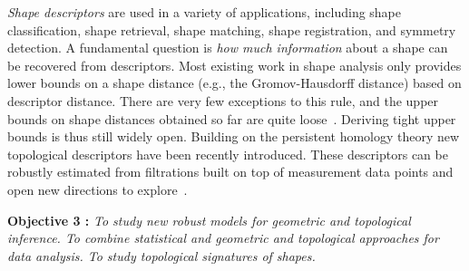 {\em Shape descriptors} are used in a variety of applications, including shape classification, shape retrieval, shape matching, shape registration, and symmetry detection.  %
A fundamental question is {\em how much information} about a shape can be recovered from descriptors. Most existing work in shape analysis only provides lower bounds on a shape distance (e.g., the Gromov-Hausdorff distance) based on descriptor distance. There are very few exceptions to this rule, and the upper bounds on shape distances obtained so far are quite loose~\cite{bbk-gmds-06,ms-gh-05}. Deriving tight upper bounds is thus still widely open. 
Building on the persistent homology theory new topological descriptors have been recently introduced. These descriptors can be robustly estimated from filtrations built on top of measurement data points  and open new directions to explore~\cite{ccgmo-ghsssp-09, socg-pbsds-10}.



\vspace{2mm}

{\bf Objective 3 :} {\em To study new {\em robust models for geometric and topological inference}.  To combine statistical  and geometric and topological approaches for data analysis. To study topological signatures of shapes.}

